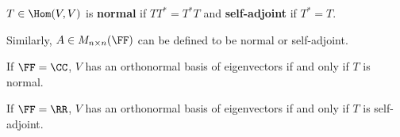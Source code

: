 \documentclass[11pt]{scrartcl}
\begin{document}
\begin{definition}
  $T \in \Hom(V,V)$ is \textbf{normal} if $TT^{*}=T^{*}T$ and
  \textbf{self-adjoint} if $T^{*}=T$.

  Similarly, $A \in M_{n\times n}(\FF)$ can be defined to be normal or self-adjoint.
\end{definition}

\begin{theorem}
  If $\FF = \CC$, $V$ has an orthonormal basis of eigenvectors if and only if $T$ is normal.

  If $\FF = \RR$, $V$ has an orthonormal basis of eigenvectors if and only if $T$ is self-adjoint.
\end{theorem}
\end{document}
